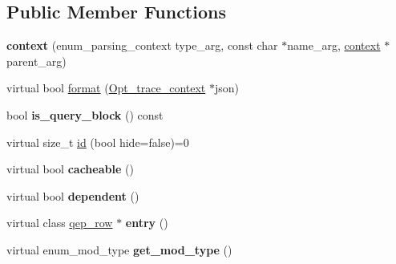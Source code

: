 \subsection*{Public Member Functions}
\begin{DoxyCompactItemize}
\item 
\mbox{\label{classopt__explain__json__namespace_1_1context_a1d6ecc764683d2aa28a77b8a413bde61}} 
{\bfseries context} (enum\+\_\+parsing\+\_\+context type\+\_\+arg, const char $\ast$name\+\_\+arg, \mbox{\hyperlink{classopt__explain__json__namespace_1_1context}{context}} $\ast$parent\+\_\+arg)
\item 
virtual bool \mbox{\hyperlink{classopt__explain__json__namespace_1_1context_a73e34a665c4550ba7725839ca643119d}{format}} (\mbox{\hyperlink{classOpt__trace__context}{Opt\+\_\+trace\+\_\+context}} $\ast$json)
\item 
\mbox{\label{classopt__explain__json__namespace_1_1context_a32706a6024a77d8293540564b893d4f6}} 
bool {\bfseries is\+\_\+query\+\_\+block} () const
\item 
virtual size\+\_\+t \mbox{\hyperlink{classopt__explain__json__namespace_1_1context_a07c46bab31a35d88c13ccdca82755aaa}{id}} (bool hide=false)=0
\item 
\mbox{\label{classopt__explain__json__namespace_1_1context_ad57a8f38c7ae4747bf14414f683c44f7}} 
virtual bool {\bfseries cacheable} ()
\item 
\mbox{\label{classopt__explain__json__namespace_1_1context_ad5e14f386bcf9d684d87bb822644807f}} 
virtual bool {\bfseries dependent} ()
\item 
\mbox{\label{classopt__explain__json__namespace_1_1context_adf122c034bb037db2be345e96aa61926}} 
virtual class \mbox{\hyperlink{classqep__row}{qep\+\_\+row}} $\ast$ {\bfseries entry} ()
\item 
\mbox{\label{classopt__explain__json__namespace_1_1context_ad540b8976731aa4798169afa9ec0fc4f}} 
virtual enum\+\_\+mod\+\_\+type {\bfseries get\+\_\+mod\+\_\+type} ()

\end{DoxyCompactItemize}

